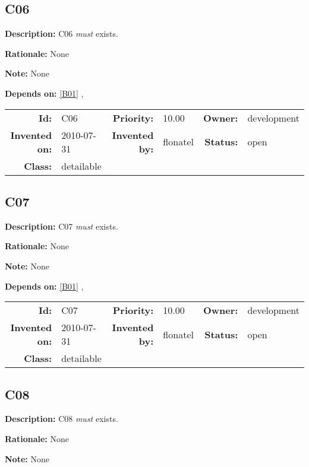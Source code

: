 \subsection{C06}\label{C06}
\textbf{Description:} C06 \textsl{must} exists.

\textbf{Rationale:} None

\textbf{Note:} None

\textbf{Depends on:} \ref{B01} , 

\par
{\small \begin{center}\begin{tabular}{rlrlrl}
\textbf{Id:} & C06 & \textbf{Priority:} & 10.00 & \textbf{Owner:} & development \\ 
\textbf{Invented on:} & 2010-07-31 & \textbf{Invented by:} & flonatel & \textbf{Status:} & open \\ 
\textbf{Class:} & detailable & & & & \\ 
\end{tabular}\end{center} }%
\subsection{C07}\label{C07}
\textbf{Description:} C07 \textsl{must} exists.

\textbf{Rationale:} None

\textbf{Note:} None

\textbf{Depends on:} \ref{B01} , 

\par
{\small \begin{center}\begin{tabular}{rlrlrl}
\textbf{Id:} & C07 & \textbf{Priority:} & 10.00 & \textbf{Owner:} & development \\ 
\textbf{Invented on:} & 2010-07-31 & \textbf{Invented by:} & flonatel & \textbf{Status:} & open \\ 
\textbf{Class:} & detailable & & & & \\ 
\end{tabular}\end{center} }%
\subsection{C08}\label{C08}
\textbf{Description:} C08 \textsl{must} exists.

\textbf{Rationale:} None

\textbf{Note:} None

